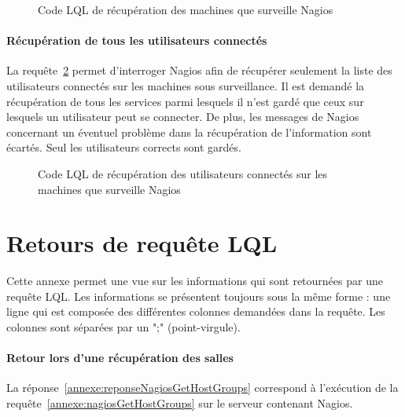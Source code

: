 \begin{appendices}
\begin{figure}[!ht]
	
	\caption{Code LQL de r\'ecup\'eration des machines que surveille Nagios}
	\label{annexe:nagiosGetResources}

\end{figure}

\subsubsection{R\'ecup\'eration de tous les utilisateurs connect\'es}

La requ\^ete~\ref{annexe:nagiosGetUsersLogged} permet d'interroger Nagios afin de r\'ecup\'erer seulement la liste des utilisateurs connect\'es sur les machines sous surveillance.
Il est demand\'e la r\'ecup\'eration de tous les services parmi lesquels il n'est gard\'e que ceux sur lesquels un utilisateur peut se connecter.
De plus, les messages de Nagios concernant un \'eventuel probl\`eme dans la r\'ecup\'eration de l'information sont \'ecart\'es.
Seul les utilisateurs \og corrects\fg{} sont gard\'es.

\vspace{0.20cm}

\begin{figure}[!ht]
	
	\caption{Code LQL de r\'ecup\'eration des utilisateurs connect\'es sur les machines que surveille Nagios}
	\label{annexe:nagiosGetUsersLogged}

\end{figure}

\chapter{Retours de requ\^ete LQL}
\label{chapterAnnexe:reponseLQLNagios}

Cette annexe permet une vue sur les informations qui sont retourn\'ees par une requ\^ete LQL.
Les informations se pr\'esentent toujours sous la m\^eme forme : une ligne qui est compos\'ee des diff\'erentes colonnes demand\'ees dans la requ\^ete.
Les colonnes sont s\'epar\'ees par un \textsf{";" (point-virgule)}.

\subsubsection{Retour lors d'une r\'ecup\'eration des salles}

La r\'eponse~\ref{annexe:reponseNagiosGetHostGroups} correspond \`a l'ex\'ecution de la requ\^ete~\ref{annexe:nagiosGetHostGroups} sur le serveur contenant Nagios.


\end{appendices}
